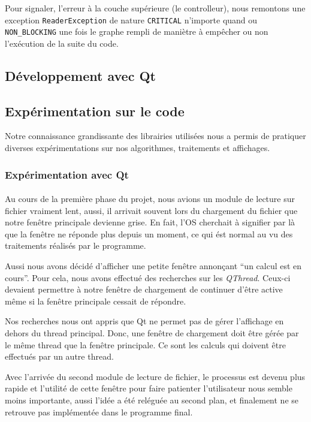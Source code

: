 Pour signaler, l'erreur à la couche supérieure (le controlleur), nous remontons une exception \verb|ReaderException| de nature \verb|CRITICAL| n'importe quand ou \verb|NON_BLOCKING| une fois le graphe rempli de maniètre à empêcher ou non l'exécution de la suite du code.


\subsection{D\'eveloppement avec Qt}



\subsection{Expérimentation sur le code}
Notre connaissance grandissante des librairies utilisées nous a permis de pratiquer diverses expérimentations sur nos algorithmes, traitements et affichages.
\subsubsection{Expérimentation avec Qt}
\paragraph{}
Au cours de la premi\`ere phase du projet, nous avions un module de lecture sur fichier vraiment lent, aussi, il arrivait souvent lors du chargement du fichier que notre fen\^etre principale devienne grise. En fait, l'OS cherchait \`a signifier par l\`a que la fen\^etre ne réponde plus depuis un moment, ce qui \'est normal au vu des traitements réalisés par le programme.

Aussi nous avons décidé d'afficher une petite fen\^etre annon\c cant ``un calcul est en cours''. Pour cela, nous avons effectué des recherches sur les \textit{QThread}. Ceux-ci devaient permettre \`a notre fen\^etre de chargement de continuer d'\^etre active m\^eme si la fen\^etre principale cessait de répondre.

Nos recherches nous ont appris que Qt ne permet pas de gérer l'affichage en dehors du thread principal. Donc, une fen\^etre de chargement doit être g\'er\'ee par le m\^eme thread que la fen\^etre principale. Ce sont les calculs qui doivent \^etre effectu\'es par un autre thread.

Avec l'arriv\'ee du second module de lecture de fichier, le processus est devenu plus rapide et l'utilit\'e de cette fen\^etre pour faire patienter l'utilisateur nous semble moins importante, aussi l'id\'ee a été rel\'egu\'ee au second plan, et finalement ne se retrouve pas impl\'ement\'ee dans le programme final.

